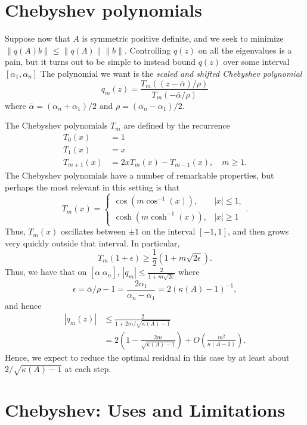 \documentclass[12pt, leqno]{article} %
\begin{document}

\section{Chebyshev polynomials}

Suppose now that $A$ is symmetric positive definite, and we seek to
minimize $\|q(A) b\| \leq \|q(\Lambda)\| \|b\|$.  Controlling $q(z)$
on all the eigenvalues is a pain, but it turns out to be simple to
instead bound $q(z)$ over some interval $[\alpha_1, \alpha_n]$
The polynomial we want is the {\em scaled and shifted Chebyshev polynomial}
\[
  q_m(z) =
  \frac{T_m\left( (z-\bar{\alpha})/\rho \right)}
       {T_m\left( -\bar{\alpha}/\rho \right)}
\]
where $\bar{\alpha} = (\alpha_n + \alpha_1)/2$ and
$\rho = (\alpha_n-\alpha_1)/2$.

The Chebyshev polynomials $T_m$ are defined by the recurrence
\begin{align*}
  T_0(x) &= 1 \\
  T_1(x) &= x \\
  T_{m+1}(x) &= 2x T_m(x) - T_{m-1}(x), \quad m \geq 1.
\end{align*}
The Chebyshev polynomials have a number of remarkable properties, but
perhaps the most relevant in this setting is that
\[
  T_m(x) =
  \begin{cases}
    \cos(m \cos^{-1}(x)), & |x| \leq 1, \\
    \cosh(m \cosh^{-1}(x)), &|x| \geq 1
  \end{cases}.
\]
Thus, $T_m(x)$ oscillates between $\pm 1$ on the interval $[-1,1]$,
and then grows very quickly outside that interval.  In particular,
\[
  T_{m}(1 + \epsilon) \geq \frac{1}{2} (1+m\sqrt{2\epsilon}).
\]
Thus, we have that on $[\alpha_, \alpha_n]$,
$|q_m| \leq \frac{2}{1+m\sqrt{2\epsilon}}$
where
\[
  \epsilon = \bar{\alpha}/\rho-1
  = \frac{2\alpha_1}{\alpha_n-\alpha_1}
  = 2 \left( \kappa(A)-1 \right)^{-1},
\]
and hence
\begin{align*}
  |q_m(z)|
  &\leq \frac{2}{1+2m/\sqrt{\kappa(A)-1}} \\
  &= 2\left( 1- \frac{2m}{\sqrt{\kappa(A)-1}}\right) + O\left(\frac{m^2}{\kappa(A-1)}\right).
\end{align*}
Hence, we expect to reduce the optimal residual in this case
by at least about $2/\sqrt{\kappa(A)-1}$ at each step.

\section{Chebyshev: Uses and Limitations}
\end{document}
